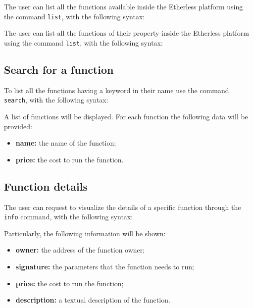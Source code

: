 The user can list all the functions available inside the Etherless platform using the command \texttt{list}, with the following syntax:
\begin{center}
\end{center}
The user can list all the functions of their property inside the Etherless platform using the command \texttt{list}, with the following syntax:
\begin{center}
\end{center}

\subsection{Search for a function}
To list all the functions having a keyword in their name use the command \texttt{search}, with the following syntax:
\begin{center}
\end{center}

A list of functions will be displayed. For each function the following data will be provided:
\begin{itemize}
	\item \textbf{name: } the name of the function;
	\item \textbf{price: } the cost to run the function.
\end{itemize}

\subsection{Function details}
The user can request to visualize the details of a specific function through the \texttt{info} command, with the following syntax: \\
\begin{center}
\end{center}
Particularly, the following information will be shown:
\begin{itemize}
	\item \textbf{owner: } the address of the function owner;
	\item \textbf{signature: } the parameters that the function needs to run;
	\item \textbf{price: } the cost to run the function;
	\item \textbf{description: } a textual description of the function.
\end{itemize}

